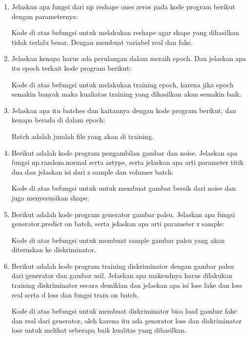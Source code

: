 \begin{enumerate}
    \item Jelaskan apa fungsi dari np reshape ones zeros pada kode program berikut dengan parameternya: 
    
    \hfill\break
    Kode di atas befungsi untuk melakukan reshape agar shape yang dihasilkan tidak terlalu besar. Dengan membuat variabel real dan fake.
        
    \item Jelaskan kenapa harus ada perulangan dalam meraih epoch. Dan jelaskan apa itu epoch terkait kode program berikut:
    
    \hfill\break
    Kode di atas befungsi untuk melakukan training epoch, karena jika epoch semakin banyak maka kualiatas training yang dihasilkan akan semakin baik.
        
    \item Jelaskan apa itu batches dan kaitannya dengan kode program berikut, dan kenapa berada di dalam epoch:
    
    \hfill\break
    Batch adalah jumlah file yang akan di training.
        
    \item Berikut adalah kode program pengambilan gambar dan noise. Jelaskan apa fungsi np.random.normal serta astype, serta jelaskan apa arti parameter titik dua dan jelaskan isi dari z sample dan volumes batch:
    
    \hfill\break
    Kode di atas befungsi untuk untuk membuat gambar bersih dari noise dan juga menyesuaikan shape.

    \item Berikut adalah kode program generator gambar palsu. Jelaskan apa fungsi generator.predict on batch, serta jelaskan apa arti parameter z sample:
    
    \hfill\break
    Kode di atas befungsi untuk membuat sample gambar palsu yang akan diteruskan ke diskriminator.

    \item Berikut adalah kode program training diskriminator dengan gambar palsu dari generator dan gambar asil. Jelaskan apa maksudnya harus dilakukan training diskriminator secara demikian dan jelaskan apa isi loss fake dan loss real serta d loss dan fungsi train on batch.
    
    \hfill\break
    Kode di atas befungsi untuk membuat diskriminator bisa load gambar fake dan real dari generator, oleh karena itu ada generator loss dan diskriminator loss untuk melihat seberapa baik kualitas yang dihasilkan.


\end{enumerate}
